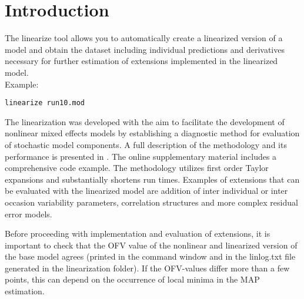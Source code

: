
\usepackage{hyperref}



\maketitle
\newcommand{\guidetoolname}{linearize}
\tableofcontents
\newpage

\section{Introduction}
The linearize tool allows you to automatically create a linearized version of a model and obtain the dataset including
individual predictions and derivatives necessary for further estimation of extensions implemented in the linearized model.\\ 
Example:
\begin{verbatim}
linearize run10.mod
\end{verbatim}

The linearization was developed with the aim to facilitate the development of nonlinear mixed effects models by establishing a diagnostic method for evaluation of stochastic model components. A full description of the methodology and its performance 
is presented in \cite{Svensson}. The online supplementary material includes a comprehensive code example. 
The methodology utilizes first order Taylor expansions and substantially shortens run times. Examples of extensions that can be evaluated with the linearized model are addition of inter individual or inter occasion variability parameters, correlation structures and more complex residual error models.

Before proceeding with implementation and evaluation of extensions, it is important to check that the OFV value of the nonlinear and linearized version of the base model agrees (printed in the command window and in the linlog.txt file generated in the linearization folder). If the OFV-values differ more than a few points, this can depend on the occurrence 
of local minima in the MAP estimation. 

